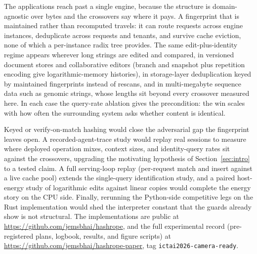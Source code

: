 \documentclass[10pt,conference]{IEEEtran}
\begin{document}
The applications reach past a single engine, because the structure is
domain-agnostic over bytes and the crossovers say where it pays. A fingerprint that is maintained rather than recomputed
travels: it can route requests across engine instances, deduplicate
across requests and tenants, and survive cache eviction, none of which
a per-instance radix tree provides. The same edit-plus-identity regime
appears wherever long strings are edited and compared, in versioned
document stores and collaborative editors (branch and snapshot plus
repetition encoding give logarithmic-memory histories), in
storage-layer deduplication keyed by maintained fingerprints instead
of rescans, and in multi-megabyte sequence data such as genomic
strings, whose lengths sit beyond every crossover measured here. In each case the query-rate ablation gives the
precondition: the win scales with how often the surrounding system
asks whether content is identical.

Keyed or verify-on-match hashing would close the adversarial gap the
fingerprint leaves open. A recorded-agent-trace study would replay real sessions
to measure where deployed operation mixes, context sizes, and
identity-query rates sit against the crossovers, upgrading the
motivating hypothesis of Section~\ref{sec:intro} to a tested claim. A
full serving-loop replay (per-request match and insert against a live
cache pool) extends the single-query identification study, and a
paired host-energy study of logarithmic edits against linear copies
would complete the energy story on the CPU side. Finally, rerunning
the Python-side competitive legs on the Rust implementation would shed
the interpreter constant that the guards already show is not
structural. The implementations are public at
\url{https://github.com/jemsbhai/hashrope}, and the full experimental
record (pre-registered plans, logbook, results, and figure scripts) at
\url{https://github.com/jemsbhai/hashrope-paper}, tag
\texttt{ictai2026-camera-ready}.



\end{document}
